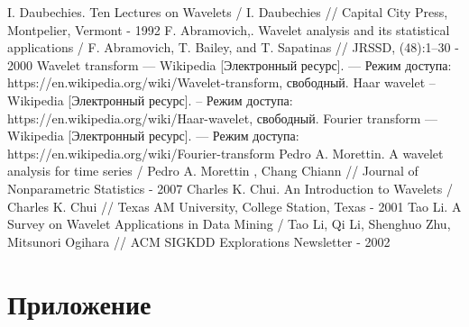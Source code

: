 \documentclass[a4paper]{article}
\newcommand{\anonsection}[1]{ \section*{#1} \addcontentsline{toc}{section}{\numberline {}#1}}
\begin{document}
	\newpage
	
	\begin{thebibliography}{8}
		I. Daubechies. Ten Lectures on Wavelets / I. Daubechies // Capital City Press, Montpelier, Vermont - 1992
		F. Abramovich,. Wavelet analysis and its statistical applications / F. Abramovich,                      T. Bailey, and T. Sapatinas // JRSSD, (48):1–30 - 2000
		Wavelet transform --- Wikipedia [Электронный ресурс].  --- Режим доступа: https://en.wikipedia.org/wiki/Wavelet-transform, свободный.
		Haar wavelet – Wikipedia [Электронный ресурс]. – Режим доступа: https://en.wikipedia.org/wiki/Haar-wavelet, свободный.
		Fourier transform --- Wikipedia [Электронный ресурс]. --- Режим доступа: https://en.wikipedia.org/wiki/Fourier-transform
		Pedro A. Morettin. A wavelet analysis for time series / Pedro A. Morettin , Chang Chiann // Journal of Nonparametric Statistics - 2007
		Charles K. Chui. An Introduction to Wavelets / Charles K. Chui // Texas AM University, College Station, Texas - 2001
		Tao Li. A Survey on Wavelet Applications in Data Mining / Tao Li, Qi Li, Shenghuo Zhu, Mitsunori Ogihara // ACM SIGKDD Explorations Newsletter  - 2002
	\end{thebibliography}
	
	\newpage
	
	\anonsection{Приложение}
	
\end{document}
